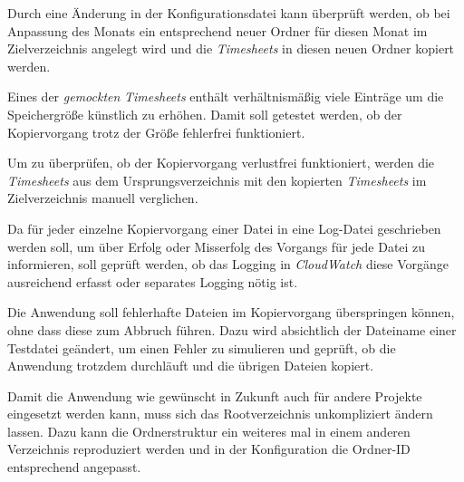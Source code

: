 Durch eine Änderung in der Konfigurationsdatei kann überprüft werden, ob bei Anpassung des Monats ein entsprechend neuer Ordner für diesen Monat im Zielverzeichnis angelegt wird und die \textit{\glspl{Timesheet}} in diesen neuen Ordner kopiert werden.

Eines der \textit{gemockten} \textit{\glspl{Timesheet}} enthält verhältnismäßig viele Einträge um die Speichergröße künstlich zu erhöhen. Damit soll getestet werden, ob der Kopiervorgang trotz der Größe fehlerfrei funktioniert.

Um zu überprüfen, ob der Kopiervorgang verlustfrei funktioniert, werden die \textit{\glspl{Timesheet}} aus dem Ursprungsverzeichnis mit den kopierten \textit{\glspl{Timesheet}} im Zielverzeichnis manuell verglichen.

Da für jeder einzelne Kopiervorgang einer Datei in eine Log-Datei geschrieben werden soll, um über Erfolg oder Misserfolg des Vorgangs für jede Datei zu informieren, soll geprüft werden, ob das Logging in \textit{CloudWatch} diese Vorgänge ausreichend erfasst oder separates Logging nötig ist.

Die Anwendung soll fehlerhafte Dateien im Kopiervorgang überspringen können, ohne dass diese zum Abbruch führen. Dazu wird absichtlich der Dateiname einer Testdatei geändert, um einen Fehler zu simulieren und geprüft, ob die Anwendung trotzdem durchläuft und die übrigen Dateien kopiert.

Damit die Anwendung wie gewünscht in Zukunft auch für andere Projekte eingesetzt werden kann, muss sich das Rootverzeichnis unkompliziert ändern lassen. Dazu kann die Ordnerstruktur ein weiteres mal in einem anderen Verzeichnis reproduziert  werden und in der Konfiguration die Ordner-ID entsprechend angepasst.


\pagebreak

